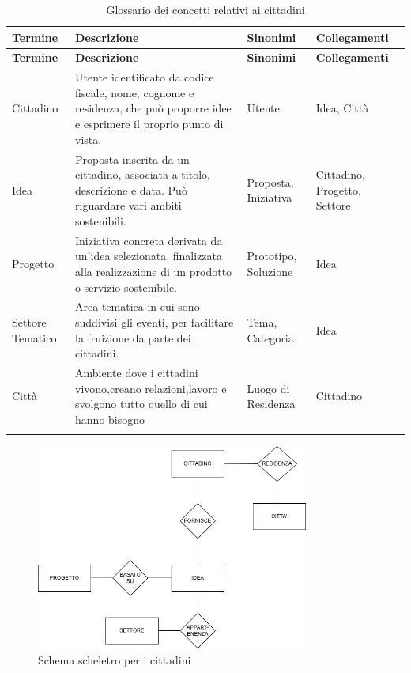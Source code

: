 \documentclass{article}
\begin{document}
\begin{longtable}{|p{3cm}|p{6.5cm}|p{2.5cm}|p{3cm}|}

\hline
\textbf{Termine} & \textbf{Descrizione} & \textbf{Sinonimi} & \textbf{Collegamenti} \\
\hline
\endfirsthead

\hline
\textbf{Termine} & \textbf{Descrizione} & \textbf{Sinonimi} & \textbf{Collegamenti} \\
\hline
\endhead

Cittadino & Utente identificato da codice fiscale, nome, cognome e residenza, che può proporre idee e esprimere il proprio punto di vista. & Utente & Idea, Città \\
\hline

Idea & Proposta inserita da un cittadino, associata a titolo, descrizione e data. Può riguardare vari ambiti sostenibili. & Proposta, Iniziativa & Cittadino, Progetto, Settore \\
\hline

Progetto & Iniziativa concreta derivata da un'idea selezionata, finalizzata alla realizzazione di un prodotto o servizio sostenibile. & Prototipo, Soluzione & Idea \\
\hline

Settore Tematico & Area tematica in cui sono suddivisi gli eventi, per facilitare la fruizione da parte dei cittadini. & Tema, Categoria & Idea \\
\hline

Città &  Ambiente dove i cittadini vivono,creano relazioni,lavoro e svolgono tutto quello di cui hanno bisogno & Luogo di Residenza & Cittadino \\
\hline

\caption{Glossario dei concetti relativi ai cittadini}
\label{tab:glossario-cittadini}
\\
\end{longtable}

\begin{figure}[H]
    \centering
    \includegraphics[width=0.8\textwidth]{images/SCHELETRO_CITTADINO.drawio.png}
    \caption{Schema scheletro per i cittadini}
    \label{fig:schema-sostenibilita1}
\end{figure}
\end{document}

